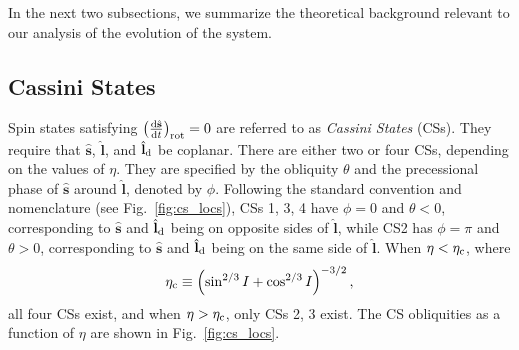 \documentclass[
        fleqn,
        usenatbib,
    ]{mnras}
\newcommand*{\rd}[2]{\frac{\mathrm{d}#1}{\mathrm{d}#2}}
\newcommand*{\bm}[1]{\boldsymbol{\mathbf{#1}}}
\newcommand*{\uv}[1]{\hat{\bm{#1}}}
\newcommand*{\p}[1]{\left(#1\right)}
\begin{document}
In the next two subsections, we summarize the theoretical background relevant to
our analysis of the evolution of the system.

\subsection{Cassini States}\label{ss:cs}

Spin states satisfying $\p{\rd{\uv{s}}{t}}_{\rm rot} = 0$ are referred to as
\emph{Cassini States} (CSs). They require that $\uv{s}$, $\uv{l}$, and
$\uv{l}_{\rm d}$ be coplanar. There are either two or four CSs, depending
on the values of $\eta$. They are specified by the obliquity $\theta$ and the
precessional phase of $\uv{s}$ around $\uv{l}$, denoted by $\phi$. Following
the standard convention and nomenclature (see Fig.~\ref{fig:cs_locs}), CSs 1, 3, 4
have $\phi = 0$ and $\theta < 0$, corresponding to $\uv{s}$ and $\uv{l}_{\rm
d}$ being on opposite sides of $\uv{l}$, while CS2 has $\phi = \pi$ and $\theta
> 0$, corresponding to $\uv{s}$ and $\uv{l}_{\rm d}$ being on the same side of
$\uv{l}$. When $\eta < \eta_{\rm c}$, where
\begin{equation}
    \eta_{\rm c} \equiv \p{\sin^{2/3}I + \cos^{2/3}I}^{-3/2},\label{eq:etac}
\end{equation}
all four CSs exist, and when $\eta > \eta_{\rm c}$, only CSs 2, 3 exist. The CS
obliquities as a function of $\eta$ are shown in Fig.~\ref{fig:cs_locs}.
\end{document}
